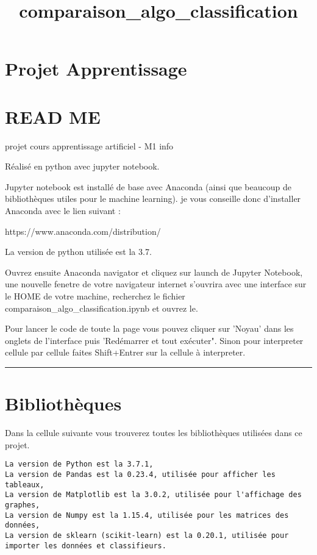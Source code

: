\documentclass[11pt]{article}
\title{comparaison\_algo\_classification}
\begin{document}
    
    
    \maketitle
    
    

    
    \section{Projet Apprentissage}\label{projet-apprentissage}

\section{READ ME}\label{read-me}

projet cours apprentissage artificiel - M1 info

Réalisé en python avec jupyter notebook.

Jupyter notebook est installé de base avec Anaconda (ainsi que beaucoup
de bibliothèques utiles pour le machine learning). je vous conseille
donc d'installer Anaconda avec le lien suivant :

https://www.anaconda.com/distribution/

La version de python utilisée est la 3.7.

Ouvrez ensuite Anaconda navigator et cliquez sur launch de Jupyter
Notebook, une nouvelle fenetre de votre navigateur internet s'ouvrira
avec une interface sur le HOME de votre machine, recherchez le fichier
comparaison\_algo\_classification.ipynb et ouvrez le.

Pour lancer le code de toute la page vous pouvez cliquer sur 'Noyau'
dans les onglets de l'interface puis 'Redémarrer et tout exécuter".
Sinon pour interpreter cellule par cellule faites Shift+Entrer sur la
cellule à interpreter.

\begin{center}\rule{0.5\linewidth}{\linethickness}\end{center}

    \section{Bibliothèques}\label{bibliothuxe8ques}

Dans la cellule suivante vous trouverez toutes les bibliothèques
utilisées dans ce projet.

\begin{verbatim}
La version de Python est la 3.7.1,
La version de Pandas est la 0.23.4, utilisée pour afficher les tableaux,
La version de Matplotlib est la 3.0.2, utilisée pour l'affichage des graphes,
La version de Numpy est la 1.15.4, utilisée pour les matrices des données,
La version de sklearn (scikit-learn) est la 0.20.1, utilisée pour importer les données et classifieurs.
\end{verbatim}
\end{document}

